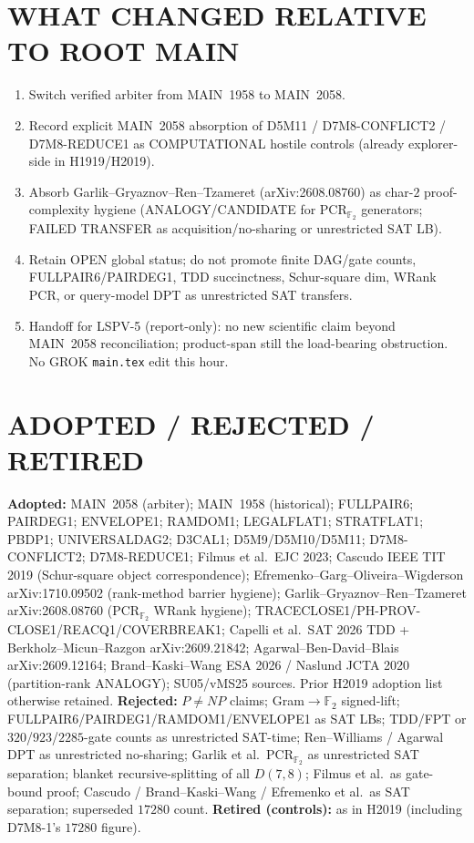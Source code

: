 \documentclass[11pt]{article}
\begin{document}
\section*{WHAT CHANGED RELATIVE TO ROOT MAIN}
\begin{enumerate}
\item Switch verified arbiter from MAIN~1958 to MAIN~2058.
\item Record explicit MAIN~2058 absorption of D5M11 / D7M8-CONFLICT2 / D7M8-REDUCE1
as COMPUTATIONAL hostile controls (already explorer-side in H1919/H2019).
\item Absorb Garlik--Gryaznov--Ren--Tzameret (arXiv:2608.08760) as char-$2$
proof-complexity hygiene (ANALOGY/CANDIDATE for PCR$_{\mathbb F_2}$ generators;
FAILED TRANSFER as acquisition/no-sharing or unrestricted SAT LB).
\item Retain OPEN global status; do not promote finite DAG/gate counts,
FULLPAIR6/PAIRDEG1, TDD succinctness, Schur-square dim, WRank PCR, or query-model
DPT as unrestricted SAT transfers.
\item Handoff for LSPV-5 (report-only): no new scientific claim beyond MAIN~2058
reconciliation; product-span still the load-bearing obstruction. No GROK
\texttt{main.tex} edit this hour.
\end{enumerate}

\section*{ADOPTED / REJECTED / RETIRED}
\textbf{Adopted:} MAIN~2058 (arbiter); MAIN~1958 (historical); FULLPAIR6; PAIRDEG1;
ENVELOPE1; RAMDOM1; LEGALFLAT1; STRATFLAT1; PBDP1; UNIVERSALDAG2; D3CAL1;
D5M9/D5M10/D5M11; D7M8-CONFLICT2; D7M8-REDUCE1; Filmus et al.\ EJC 2023;
Cascudo IEEE TIT 2019 (Schur-square object correspondence);
Efremenko--Garg--Oliveira--Wigderson arXiv:1710.09502 (rank-method barrier hygiene);
Garlik--Gryaznov--Ren--Tzameret arXiv:2608.08760 (PCR$_{\mathbb F_2}$ WRank hygiene);
TRACECLOSE1/PH-PROV-CLOSE1/REACQ1/COVERBREAK1; Capelli et al.\ SAT 2026 TDD +
Berkholz--Micun--Razgon arXiv:2609.21842; Agarwal--Ben-David--Blais arXiv:2609.12164;
Brand--Kaski--Wang ESA 2026 / Naslund JCTA 2020 (partition-rank ANALOGY);
SU05/vMS25 sources. Prior H2019 adoption list otherwise retained.
\textbf{Rejected:} $P\neq NP$ claims; Gram$\to\mathbb F_2$ signed-lift;
FULLPAIR6/PAIRDEG1/RAMDOM1/ENVELOPE1 as SAT LBs; TDD/FPT or $320$/$923$/$2285$-gate
counts as unrestricted SAT-time; Ren--Williams / Agarwal DPT as unrestricted
no-sharing; Garlik et al.\ PCR$_{\mathbb F_2}$ as unrestricted SAT separation;
blanket recursive-splitting of all $D(7,8)$; Filmus et al.\ as gate-bound proof;
Cascudo / Brand--Kaski--Wang / Efremenko et al.\ as SAT separation; superseded
$17280$ count.
\textbf{Retired (controls):} as in H2019 (including D7M8-1's $17280$ figure).
\end{document}
